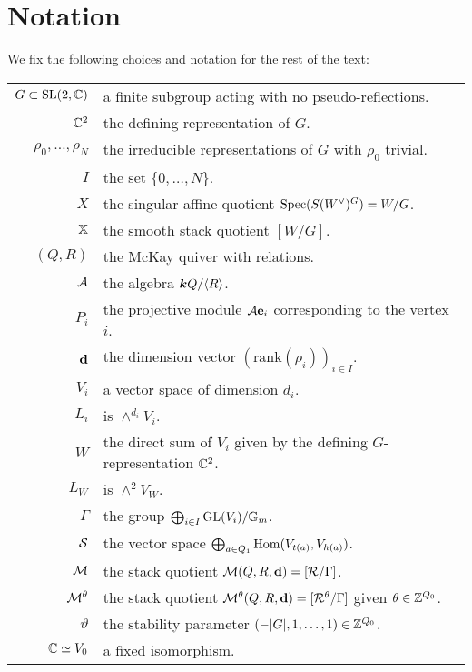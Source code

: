 \documentclass{amsart}
\theoremstyle{definition}
\begin{document}
\section*{Notation}
We fix the following choices and notation for the rest of the text:

\begin{centering}
\begin{tabular}{r l}
    $G \subset \operatorname{SL}(2,\mathbb{C})$ & a finite subgroup acting with no pseudo-reflections. \\
    $\mathbb{C}^2$ & the defining representation of $G$. \\
    $\rho_0, \ldots, \rho_N$ & the irreducible representations of $G$ with $\rho_0$ trivial. \\
    $I$ & the set $\{0,\ldots,N\}$.  \\
    $X$ & the singular affine quotient $\operatorname{Spec}(S(W^\vee)^G) = W/G$. \\
    $\mathbb{X}$ & the smooth stack quotient $[W/G]$. \\
    $(Q,R)$ & the McKay quiver with relations. \\
    $\mathcal{A}$ & the algebra ${\boldsymbol{k}} Q/ \langle R\rangle$. \\
    $P_i$ & the projective module $\mathcal{A}\mathbf{e}_i$ corresponding to the vertex $i$. \\
    $\mathbf{d}$ & the dimension vector $(\text{rank}(\rho_i))_{i \in I}$. \\
    $V_i$ & a vector space of dimension $d_i$. \\
    $L_i$ & is $\wedge^{d_i} V_i$. \\
    $W$ & the direct sum of $V_i$ given by the defining $G$-representation $\mathbb{C}^2$. \\
    $L_W$ & is $\wedge^{2} V_W$. \\
    $\Gamma$ & the group $\bigoplus_{i \in I} \text{GL}(V_i) / \mathbb{G}_m$. \\
    $\mathcal{S}$ & the vector space $\bigoplus_{a \in Q_1} \operatorname{Hom}(V_{t(a)}, V_{h(a)})$. \\
    $\mathcal{M}$ & the stack quotient  $\mathcal{M}(Q,R,\mathbf{d})=[\mathcal{R}/\Gamma]$. \\
    $\mathcal{M}^\theta$ & the stack quotient $\mathcal{M}^\theta(Q,R,\mathbf{d})=[\mathcal{R}^\theta/\Gamma]$ given $\theta \in \mathbb{Z}^{Q_0}$. \\
    $\vartheta$ & the stability parameter $(-|G|,1, \ldots, 1) \in \mathbb{Z}^{Q_0}$. \\
    $\mathbb{C} \simeq V_0$ & a fixed isomorphism.
    \end{tabular}
\end{centering}
\end{document}
